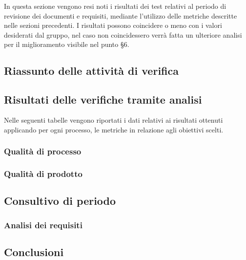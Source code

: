 \documentclass[../piano-di-qualifica.tex]{subfiles}
\begin{document}
In questa sezione vengono resi noti i risultati dei test relativi al periodo di revisione dei documenti e requisiti, mediante l'utilizzo delle metriche descritte nelle sezioni precedenti.
I risultati possono coincidere o meno con i valori desiderati dal gruppo, nel caso non coincidessero verrà fatta un ulteriore analisi per il miglioramento visibile nel punto §6.

\subsection{Riassunto delle attività di verifica}%
\label{sub:iso/riassunto_delle_attivita_di_verifica}

\subsection{Risultati delle verifiche tramite analisi}%
\label{sub:iso/risultati_delle_verifiche_tramite_analisi}
Nelle seguenti tabelle vengono riportati i dati relativi ai risultati ottenuti applicando per ogni processo, le metriche in relazione agli obiettivi scelti.

\subsubsection{Qualità di processo}
\label{sub:qualita_di_processo}

\subsubsection{Qualità di prodotto}
\label{sub:qualita_di_prodotto}

\subsection{Consultivo di periodo}%
\label{sub:consultivo_di_periodo}

\subsubsection{Analisi dei requisiti}
\label{sub:analisi dei requisiti}

\subsection{Conclusioni}%
\label{sub:conclusioni}
\end{document}
